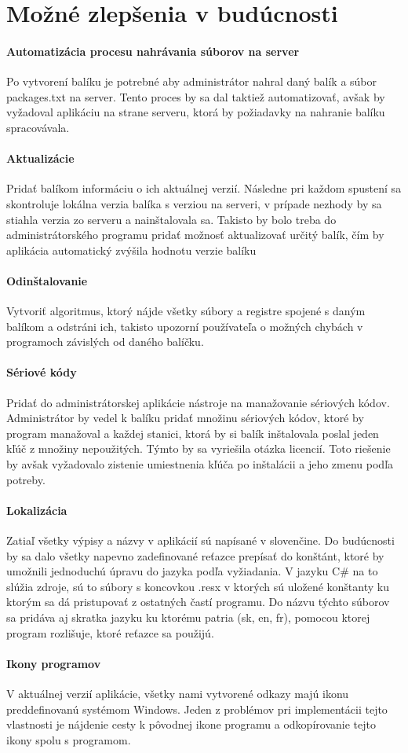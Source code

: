 \section{Možné zlepšenia v budúcnosti}
\label{sec:zlepsenia}
\paragraph{Automatizácia procesu nahrávania súborov na server}
Po vytvorení balíku je potrebné aby administrátor nahral daný balík a súbor packages.txt na server. Tento proces by sa dal taktiež automatizovať, avšak by vyžadoval aplikáciu na strane serveru, ktorá by požiadavky na nahranie balíku spracovávala.

\paragraph{Aktualizácie}
Pridať balíkom informáciu o ich aktuálnej verzií. Následne pri každom spustení sa skontroluje lokálna verzia balíka s verziou na serveri, v prípade nezhody by sa stiahla verzia zo serveru a nainštalovala sa. Takisto by bolo treba do administrátorského programu pridať možnosť aktualizovať určitý balík, čím by aplikácia automatický zvýšila hodnotu verzie balíku

\paragraph{Odinštalovanie}
Vytvoriť algoritmus, ktorý nájde všetky súbory a registre spojené s daným balíkom a odstráni ich, takisto upozorní používateľa o možných chybách v programoch závislých od daného balíčku.

\paragraph{Sériové kódy}
Pridať do administrátorskej aplikácie nástroje na manažovanie sériových kódov. Administrátor by vedel k balíku pridať množinu sériových kódov, ktoré by program manažoval a každej stanici, ktorá by si balík inštalovala poslal jeden kľúč z množiny nepoužitých. Týmto by sa vyriešila otázka licencií. Toto riešenie by avšak vyžadovalo zistenie umiestnenia kľúča po inštalácii a jeho zmenu podľa potreby.

\paragraph{Lokalizácia}
Zatiaľ všetky výpisy a názvy v aplikácií sú napísané v slovenčine. Do budúcnosti by sa dalo všetky napevno zadefinované reťazce prepísať do konštánt, ktoré by umožnili jednoduchú úpravu do jazyka podľa vyžiadania. V jazyku C\# na to slúžia zdroje, sú to súbory s koncovkou .resx v ktorých sú uložené konštanty ku ktorým sa dá pristupovať z ostatných častí programu. Do názvu týchto súborov sa pridáva aj skratka jazyku ku ktorému patria (sk, en, fr), pomocou ktorej program rozlišuje, ktoré reťazce sa použijú.

\paragraph{Ikony programov}
V aktuálnej verzií aplikácie, všetky nami vytvorené odkazy majú ikonu preddefinovanú systémom Windows. Jeden z problémov pri implementácii tejto vlastnosti je nájdenie cesty k pôvodnej ikone programu a odkopírovanie tejto ikony spolu s programom. 